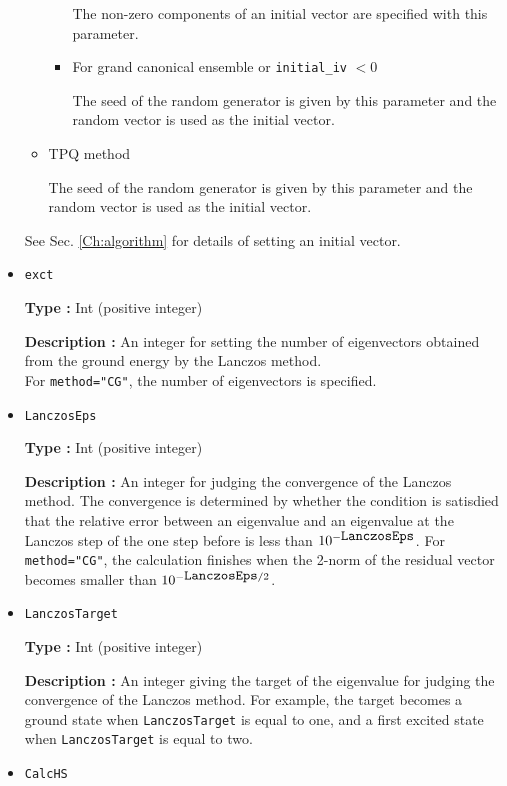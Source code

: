 \begin{itemize}
\begin{itemize}
\begin{itemize}
The non-zero components of an initial vector are specified with this parameter. 

\item{For grand canonical ensemble or \verb|initial_iv| $< 0$}

The seed of the random generator is given by this parameter and the random vector is used as the initial vector.
\end{itemize}

\item{TPQ method}

The seed of the random generator is given by this parameter and the random vector is used as the initial vector.
\end{itemize}
See Sec. \ref{Ch:algorithm} for details of setting an initial vector.

 \item  \verb|exct|

{\bf Type :} Int (positive integer)

{\bf Description :} 
 An integer for setting the number of eigenvectors obtained from the ground energy by the Lanczos method.\\
For \verb|method="CG"|, the number of eigenvectors is specified.

\item   \verb|LanczosEps|
   
{\bf Type :} Int (positive integer)

{\bf Description :} An integer for judging the convergence of the Lanczos method. The convergence is determined by whether the condition is satisdied that the relative error between an eigenvalue and an eigenvalue at the Lanczos step of the one step before is less than $10^{- \verb|LanczosEps|}$.
For \verb|method="CG"|, the calculation finishes when the 2-norm of the residual vector
becomes smaller than $10^{- \verb|LanczosEps|/2}$.

 \item  \verb|LanczosTarget| 
   
 {\bf Type :} Int (positive integer)

  {\bf Description :} An integer giving the target of the eigenvalue for judging the convergence of the Lanczos method. For example, the target becomes a ground state when \verb|LanczosTarget|  is equal to one, and a first excited state when  \verb|LanczosTarget|  is equal to two.

  \item  \verb|CalcHS| 
   

\end{itemize}
